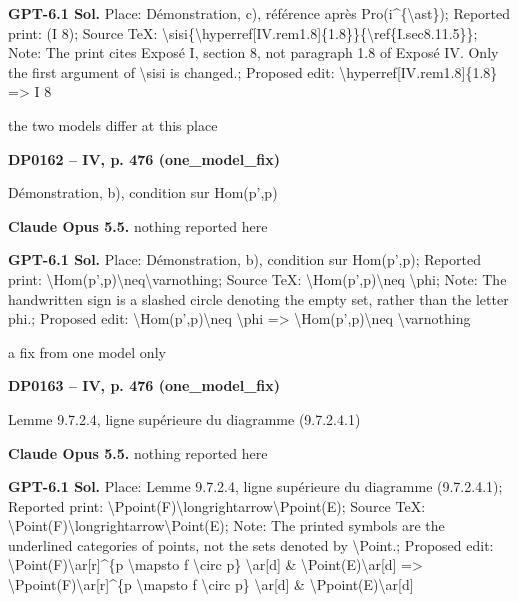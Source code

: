 \textbf{GPT-6.1 Sol.} Place: Démonstration, c), référence après Pro(i\textasciicircum{}\{\textbackslash{}ast\}); Reported print: (I 8); Source TeX: \textbackslash{}sisi\{\textbackslash{}hyperref[IV.rem1.8]\{1.8\}\}\{\textbackslash{}ref\{I.sec8.11.5\}\}; Note: The print cites Exposé I, section 8, not paragraph 1.8 of Exposé IV. Only the first argument of \textbackslash{}sisi is changed.; Proposed edit: \textbackslash{}hyperref[IV.rem1.8]\{1.8\} =\allowbreak > I 8\par
the two models differ at this place\par
\par\noindent\hypertarget{DP0162}{}\textbf{DP0162 -- IV, p. 476 (one\_model\_fix)}\par
Démonstration, b), condition sur Hom(p',p)\par
\textbf{Claude Opus 5.5.} nothing reported here\par
\textbf{GPT-6.1 Sol.} Place: Démonstration, b), condition sur Hom(p',p); Reported print: \textbackslash{}Hom(p',p)\textbackslash{}neq\textbackslash{}varnothing; Source TeX: \textbackslash{}Hom(p',p)\textbackslash{}neq \textbackslash{}phi; Note: The handwritten sign is a slashed circle denoting the empty set, rather than the letter phi.; Proposed edit: \textbackslash{}Hom(p',p)\textbackslash{}neq \textbackslash{}phi =\allowbreak > \textbackslash{}Hom(p',p)\textbackslash{}neq \textbackslash{}varnothing\par
a fix from one model only\par
\par\noindent\hypertarget{DP0163}{}\textbf{DP0163 -- IV, p. 476 (one\_model\_fix)}\par
Lemme 9.7.2.4, ligne supérieure du diagramme (9.7.2.4.1)\par
\textbf{Claude Opus 5.5.} nothing reported here\par
\textbf{GPT-6.1 Sol.} Place: Lemme 9.7.2.4, ligne supérieure du diagramme (9.7.2.4.1); Reported print: \textbackslash{}Ppoint(F)\textbackslash{}longrightarrow\textbackslash{}Ppoint(E); Source TeX: \textbackslash{}Point(F)\textbackslash{}longrightarrow\textbackslash{}Point(E); Note: The printed symbols are the underlined categories of points, not the sets denoted by \textbackslash{}Point.; Proposed edit: \textbackslash{}Point(F)\textbackslash{}ar[r]\textasciicircum{}\{p \textbackslash{}mapsto f \textbackslash{}circ p\} \textbackslash{}ar[d] \& \textbackslash{}Point(E)\textbackslash{}ar[d] =\allowbreak > \textbackslash{}Ppoint(F)\textbackslash{}ar[r]\textasciicircum{}\{p \textbackslash{}mapsto f \textbackslash{}circ p\} \textbackslash{}ar[d] \& \textbackslash{}Ppoint(E)\textbackslash{}ar[d]\par
